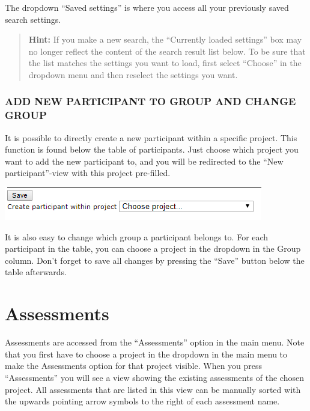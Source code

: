 \documentclass[]{book}
\begin{document}
The dropdown ``Saved settings'' is where you access all your previously saved search settings.

\begin{quote}
\textbf{Hint:} If you make a new search, the ``Currently loaded settings'' box may no longer reflect the content of the search result list below. To be sure that the list matches the settings you want to load, first select ``Choose'' in the dropdown menu and then reselect the settings you want.
\end{quote}

\hypertarget{add-new-participant-to-group-and-change-group}{%
\subsection{ADD NEW PARTICIPANT TO GROUP AND CHANGE GROUP}\label{add-new-participant-to-group-and-change-group}}

It is possible to directly create a new participant within a specific project. This function is found below the table of participants. Just choose which project you want to add the new participant to, and you will be redirected to the ``New participant''-view with this project pre-filled.

\includegraphics{images/add-new-participants.png}

It is also easy to change which group a participant belongs to. For each participant in the table, you can choose a project in the dropdown in the Group column. Don't forget to save all changes by pressing the ``Save'' button below the table afterwards.

\hypertarget{assessments}{%
\chapter{Assessments}\label{assessments}}

Assessments are accessed from the ``Assessments'' option in the main menu. Note that you first have to choose a project in the dropdown in the main menu to make the Assessments option for that project visible. When you press ``Assessments'' you will see a view showing the existing assessments of the chosen project. All assessments that are listed in this view can be manually sorted with the upwards pointing arrow symbols to the right of each assessment name.
\end{document}
